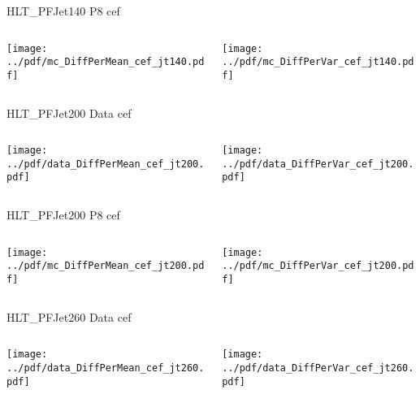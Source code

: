 \documentclass[9pt]{beamer}
\begin{document}
\begin{frame}[t]{HLT\_PFJet140 P8 cef}
\begin{columns}[T]
  \begin{column}{.5\textwidth}
  \texttt{[image: ../pdf/mc\_DiffPerMean\_cef\_jt140.pdf]}
  \end{column}
  \begin{column}{.5\textwidth}
  \texttt{[image: ../pdf/mc\_DiffPerVar\_cef\_jt140.pdf]}
  \end{column}
\end{columns}
\end{frame}

\begin{frame}[t]{HLT\_PFJet200 Data cef}
\begin{columns}[T]
  \begin{column}{.5\textwidth}
  \texttt{[image: ../pdf/data\_DiffPerMean\_cef\_jt200.pdf]}
  \end{column}
  \begin{column}{.5\textwidth}
  \texttt{[image: ../pdf/data\_DiffPerVar\_cef\_jt200.pdf]}
  \end{column}
\end{columns}
\end{frame}

\begin{frame}[t]{HLT\_PFJet200 P8 cef}
\begin{columns}[T]
  \begin{column}{.5\textwidth}
  \texttt{[image: ../pdf/mc\_DiffPerMean\_cef\_jt200.pdf]}
  \end{column}
  \begin{column}{.5\textwidth}
  \texttt{[image: ../pdf/mc\_DiffPerVar\_cef\_jt200.pdf]}
  \end{column}
\end{columns}
\end{frame}

\begin{frame}[t]{HLT\_PFJet260 Data cef}
\begin{columns}[T]
  \begin{column}{.5\textwidth}
  \texttt{[image: ../pdf/data\_DiffPerMean\_cef\_jt260.pdf]}
  \end{column}
  \begin{column}{.5\textwidth}
  \texttt{[image: ../pdf/data\_DiffPerVar\_cef\_jt260.pdf]}
  \end{column}
\end{columns}
\end{frame}
\end{document}
